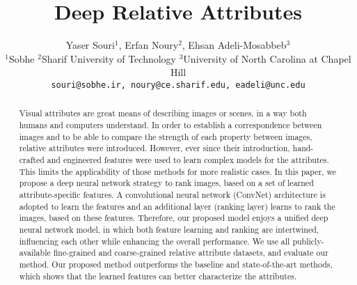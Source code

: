 \documentclass[10pt,twocolumn,letterpaper]{article}
\begin{document}
\title{Deep Relative Attributes}

\author{Yaser Souri$^1$, Erfan Noury$^2$, Ehsan Adeli-Mosabbeb$^3$\\
$^1$Sobhe \quad $^2$Sharif University of Technology \quad $^3$University of North Carolina at Chapel Hill\\
{\tt\small souri@sobhe.ir, noury@ce.sharif.edu, eadeli@unc.edu}
}

\maketitle

\begin{abstract}
Visual attributes are great means of describing images or scenes, in a way both humans and computers understand. In order to establish a correspondence between images and to be able to compare the strength of each property between images, relative attributes were introduced. However, ever since their introduction, hand-crafted and engineered features were used to learn complex models for the attributes. This limits the applicability of those methods for more realistic cases. In this paper, we propose a deep neural network strategy to rank images, based on a set of learned attribute-specific features. A convolutional neural network (ConvNet) architecture is adopted to learn the features and an additional layer (ranking layer) learns to rank the images, based on these features. Therefore, our proposed model enjoys a unified deep neural network model, in which both feature learning and ranking are intertwined, influencing each other while enhancing the overall performance. We use all publicly-available fine-grained and coarse-grained relative attribute datasets, and evaluate our method. Our proposed method outperforms the baseline and state-of-the-art methods, which shows that the learned features can better characterize the attributes.
\end{abstract}








{\small


}
\end{document}
